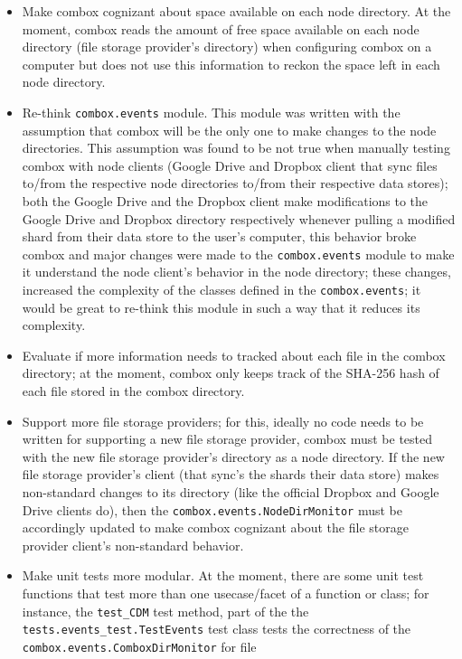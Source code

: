 \begin{itemize}
\item Make combox cognizant about space available on each node
  directory. At the moment, combox reads the amount of free space
  available on each node directory (file storage provider's directory)
  when configuring combox on a computer but does not use this
  information to reckon the space left in each node directory.
\item Re-think \verb+combox.events+ module. This module was written
  with the assumption that combox will be the only one to make changes
  to the node directories. This assumption was found to be not true
  when manually testing combox with node clients (Google Drive and
  Dropbox client that sync files to/from the respective node
  directories to/from their respective data stores); both the Google
  Drive and the Dropbox client make modifications to the Google Drive
  and Dropbox directory respectively whenever pulling a modified shard
  from their data store to the user's computer, this behavior broke
  combox and major changes were made to the \verb+combox.events+
  module to make it understand the node client's behavior in the node
  directory; these changes, increased the complexity of the classes
  defined in the \verb+combox.events+; it would be great to re-think
  this module in such a way that it reduces its complexity.
\item Evaluate if more information needs to tracked about each file in
  the combox directory; at the moment, combox only keeps track of the
  SHA-256 hash of each file stored in the combox directory.
\item Support more file storage providers; for this, ideally no code
  needs to be written for supporting a new file storage provider,
  combox must be tested with the new file storage provider's directory
  as a node directory. If the new file storage provider's client (that
  sync's the shards their data store) makes non-standard changes to its
  directory (like the official Dropbox and Google Drive clients do),
  then the \verb+combox.events.NodeDirMonitor+ must be accordingly
  updated to make combox cognizant about the file storage provider
  client's non-standard behavior.
\item Make unit tests more modular. At the moment, there are some unit
  test functions that test more than one usecase/facet of a function
  or class; for instance, the \verb+test_CDM+ test method, part of the
  the \verb+tests.events_test.TestEvents+ test class tests the
  correctness of the \verb+combox.events.ComboxDirMonitor+ for file

\end{itemize}
